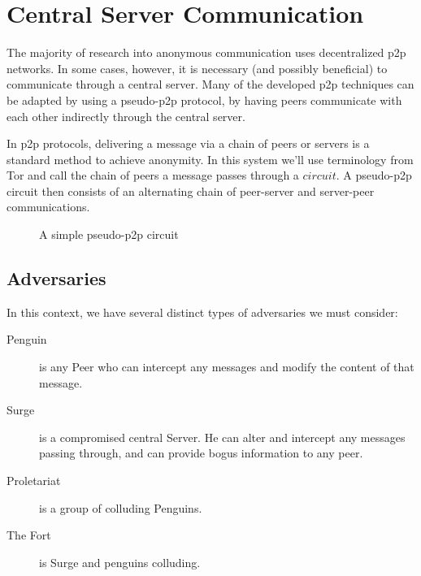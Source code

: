 \documentclass[twocolumn]{paper}
\begin{document}
\section{Central Server Communication}
The majority of research into anonymous communication uses decentralized p2p networks. In some cases, however, it is necessary (and possibly beneficial) to communicate through a central server. Many of the developed p2p techniques can be adapted by using a pseudo-p2p protocol, by having peers communicate with each other indirectly through the central server. 

In p2p protocols, delivering a message via a chain of peers or servers is a standard method to achieve anonymity. In this system we'll use terminology from Tor and call the chain of peers a message passes through a $circuit$. A pseudo-p2p circuit then consists of an alternating chain of peer-server and server-peer communications.

\begin{figure}[ht]
\begin{center}
\end{center}
  \caption{A simple pseudo-p2p circuit}
\end{figure}

\subsection{Adversaries}
In this context, we have several distinct types of adversaries we must consider:
\begin{description}
\item[Penguin] 
  is any Peer who can intercept any messages and modify the content of that message.
\item[Surge] 
   is a compromised central Server. He can alter and intercept any messages passing through, and can provide bogus information to any peer.
\item[Proletariat] 
  is a group of colluding Penguins.
\item[The Fort] 
  is Surge and penguins colluding. 
\end{description}
\end{document}
